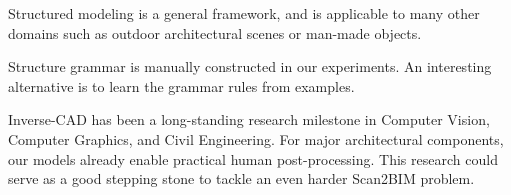  Structured modeling is a
general framework, and is applicable to many other domains such as
outdoor architectural scenes or man-made objects.
%

 Structure
grammar is manually constructed in our experiments. An interesting
alternative is to learn the grammar rules from examples.

 Inverse-CAD has been a
long-standing research milestone in Computer Vision, Computer Graphics,
and Civil Engineering.  For major architectural components, our models
already enable practical human post-processing. This research could
serve as a good stepping stone to tackle an even harder Scan2BIM
problem.

